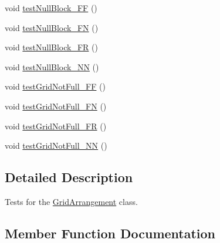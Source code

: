 \begin{DoxyCompactItemize}
void \mbox{\hyperlink{classorg_1_1jfree_1_1chart_1_1block_1_1_grid_arrangement_test_ab54a6b004fbfc35ff77b763ec020e414}{test\+Null\+Block\+\_\+\+FF}} ()
\item 
void \mbox{\hyperlink{classorg_1_1jfree_1_1chart_1_1block_1_1_grid_arrangement_test_a1b6da926bae77260aee9ac4a8e3d313e}{test\+Null\+Block\+\_\+\+FN}} ()
\item 
void \mbox{\hyperlink{classorg_1_1jfree_1_1chart_1_1block_1_1_grid_arrangement_test_aa9bc6f1a88bebaec7961a41fb0164a7c}{test\+Null\+Block\+\_\+\+FR}} ()
\item 
void \mbox{\hyperlink{classorg_1_1jfree_1_1chart_1_1block_1_1_grid_arrangement_test_af51a2872738b1641afbb1152138c2a62}{test\+Null\+Block\+\_\+\+NN}} ()
\item 
void \mbox{\hyperlink{classorg_1_1jfree_1_1chart_1_1block_1_1_grid_arrangement_test_ae3f86e4e688da934d231053462e26740}{test\+Grid\+Not\+Full\+\_\+\+FF}} ()
\item 
void \mbox{\hyperlink{classorg_1_1jfree_1_1chart_1_1block_1_1_grid_arrangement_test_acbdef00bb1db434ce1f6d9f53f9c4beb}{test\+Grid\+Not\+Full\+\_\+\+FN}} ()
\item 
void \mbox{\hyperlink{classorg_1_1jfree_1_1chart_1_1block_1_1_grid_arrangement_test_a89da5a4cc5eeafa6f53f54e8a61dc881}{test\+Grid\+Not\+Full\+\_\+\+FR}} ()
\item 
void \mbox{\hyperlink{classorg_1_1jfree_1_1chart_1_1block_1_1_grid_arrangement_test_a76fead874570869fe436ad5427dc8944}{test\+Grid\+Not\+Full\+\_\+\+NN}} ()
\end{DoxyCompactItemize}


\subsection{Detailed Description}
Tests for the \mbox{\hyperlink{classorg_1_1jfree_1_1chart_1_1block_1_1_grid_arrangement}{Grid\+Arrangement}} class. 

\subsection{Member Function Documentation}
\mbox{\label{classorg_1_1jfree_1_1chart_1_1block_1_1_grid_arrangement_test_aadc9ac563c51ab06eb0f5596c169caa0}} 
